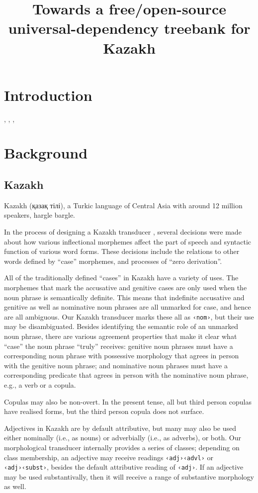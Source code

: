 \documentclass[a4paper,11pt, onecolumn,twoside]{article}
\title{Towards a free/open-source universal-dependency treebank for Kazakh}
\newcommand{\tag}[1]{\texttt{‹#1›}}
\begin{document}
\maketitleabstract{}
\thispagestyle{firststyle}

\section{Introduction}

\citet{Lynn12}, \citet{Atalay03}, \citet{Oflazer03}, \citet{DeMarneffe14}

\section{Background}

\subsection{Kazakh}\label{sec:kazakh}

Kazakh (қазақ тілі), a Turkic language of Central Asia with around 12 million speakers, hargle bargle. %

In the process of designing a Kazakh transducer \citep{Washington14}, several decisions were made about how various inflectional morphemes affect the part of speech and syntactic function of various word forms.  These decisions include the relations to other words defined by ``case'' morphemes, and processes of ``zero derivation''.

All of the traditionally defined ``cases'' in Kazakh have a variety of uses.  The morphemes that mark the accusative and genitive cases are only used when the noun phrase is semantically definite.  This means that indefinite accusative and genitive as well as nominative noun phrases are all unmarked for case, and hence are all ambiguous.  Our Kazakh transducer marks these all as \tag{nom}, but their use may be disambiguated.  Besides identifying the semantic role of an unmarked noun phrase, there are various agreement properties that make it clear what ``case'' the noun phrase ``truly'' receives: genitive noun phrases must have a corresponding noun phrase with possessive morphology that agrees in person with the genitive noun phrase; and nominative noun phrases must have a corresponding predicate that agrees in person with the nominative noun phrase, e.g., a verb or a copula.

Copulas may also be non-overt.  In the present tense, all but third person copulas have realised forms, but the third person copula does not surface.

Adjectives in Kazakh are by default attributive, but many may also be used either nominally (i.e., as nouns) or adverbially (i.e., as adverbs), or both.  Our morphological transducer internally provides a series of classes; depending on class membership, an adjective may receive readings \tag{adj}\tag{advl} or \tag{adj}\tag{subst}, besides the default attributive reading of \tag{adj}.  If an adjective may be used substantivally, then it will receive a range of substantive morphology as well.
\end{document}
